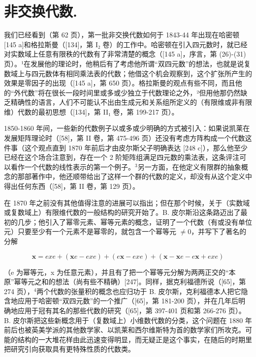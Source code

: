\chapter{非交换代数.}

我们已经看到（第 62 页），第一批非交换代数如何于 1843-44 年出现在哈密顿 {[}145 a{]}和格拉斯曼（{[}134{]}，第 I₂ 卷）的工作中。哈密顿在引入四元数时，就已经对实数域上任意有限秩的代数有了非常清楚的概念（{[}145 a{]}，序言，第 (26)-(31) 页）。¹在发展他的理论时，他稍后有了考虑他所谓“双四元数”的想法，也就是说复数域上与四元数体有相同乘法表的代数；他借这个机会观察到，这个扩张所产生的效果是零因子的出现（{[}145 a{]}，第 650 页）。格拉斯曼的观点有些不同，而且他的“外代数”将在很长一段时间里或多或少独立于代数理论之外，²但用他那仍然缺乏精确性的语言，人们不可能认不出由生成元和关系组所定义的（有限维或非有限维）代数的最初思想（{[}134{]}，第 II₁ 卷，第 199-217 页）。

1850-1860 年间，一些新的代数例子以或多或少明确的方式被引入：如果说凯莱在发展矩阵理论时（{[}58{]}，第 II 卷，第 475-496 页）还没有考虑方阵构成一个代数这件事（这个观点直到 1870 年前后才由皮尔斯父子明确表达 {[}248 c{]}），那么他至少已经在这个场合注意到，存在一个 2 阶矩阵组满足四元数的乘法表，这条评注可以看作一个代数的线性表示的第一个例子。\(^{3}\)另一方面，在他定义有限群的抽象概念的那部著作中，他还顺带给出了这样一个群的代数的定义，却没有从这个定义中得出任何东西（{[}58{]}，第 II 卷，第 129 页）。

在 1870 年之前没有其他值得注意的进展可以指出；但在那个时候，关于（实数域或复数域上）有限维代数的一般结构的研究开始了。B. 皮尔斯沿这条路迈出了最初的几步；他引入了幂零元素、幂等元素的概念，证明了一个代数（有或没有单位元）只要至少有一个元素不是幂零的，就包含一个幂等元 \(\neq 0\)，并写下了著名的分解

\[
\boldsymbol {x} = e x e + (\boldsymbol {x} e - e x e) + (e \boldsymbol {x} - e x e) + (\boldsymbol {x} - \boldsymbol {x} e - e \boldsymbol {x} + e x e)
\]

（e 为幂等元，x 为任意元素），并且有了把一个幂等元分解为两两正交的“本原”幂等元之和的想法（尚有些不精确）{[}247{]}。同样，据克利福德所说（{[}65{]}，第 274 页），\(^{4}\)两个代数的张量积的概念也应归功于 B. 皮尔斯，克利福德本人把它隐含地应用于哈密顿“双四元数”的一个推广（{[}65{]}，第 181-200 页），并在几年后明确地应用于冠有其名的那些代数的研究（{[}65{]}，第 397-401 页和第 266-276 页）。B. 皮尔斯把这些新概念用于（复数域上）小维数代数的分类，这个问题在 1880 年前后也被英美学派的其他数学家、以凯莱和西尔维斯特为首的数学家们所攻克。可能的结构的一大堆花样由此迅速变得明显，而无疑正是这个事实，在随后的时期里把研究引向获取具有更特殊性质的代数类。

